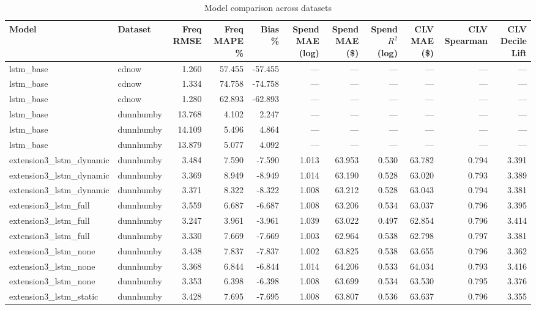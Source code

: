 \begin{table}
\caption{Model comparison across datasets}
\label{tab:model_comparison}
\begin{tabular}{llrrrrrrrrr}
\toprule
Model & Dataset & Freq RMSE & Freq MAPE \% & Bias \% & Spend MAE (log) & Spend MAE (\$) & Spend $R^2$ (log) & CLV MAE (\$) & CLV Spearman & CLV Decile Lift \\
\midrule
lstm_base & cdnow & 1.260 & 57.455 & -57.455 & — & — & — & — & — & — \\
lstm_base & cdnow & 1.334 & 74.758 & -74.758 & — & — & — & — & — & — \\
lstm_base & cdnow & 1.280 & 62.893 & -62.893 & — & — & — & — & — & — \\
lstm_base & dunnhumby & 13.768 & 4.102 & 2.247 & — & — & — & — & — & — \\
lstm_base & dunnhumby & 14.109 & 5.496 & 4.864 & — & — & — & — & — & — \\
lstm_base & dunnhumby & 13.879 & 5.077 & 4.092 & — & — & — & — & — & — \\
extension3_lstm_dynamic & dunnhumby & 3.484 & 7.590 & -7.590 & 1.013 & 63.953 & 0.530 & 63.782 & 0.794 & 3.391 \\
extension3_lstm_dynamic & dunnhumby & 3.369 & 8.949 & -8.949 & 1.014 & 63.190 & 0.528 & 63.020 & 0.793 & 3.389 \\
extension3_lstm_dynamic & dunnhumby & 3.371 & 8.322 & -8.322 & 1.008 & 63.212 & 0.528 & 63.043 & 0.794 & 3.381 \\
extension3_lstm_full & dunnhumby & 3.559 & 6.687 & -6.687 & 1.008 & 63.206 & 0.534 & 63.037 & 0.796 & 3.395 \\
extension3_lstm_full & dunnhumby & 3.247 & 3.961 & -3.961 & 1.039 & 63.022 & 0.497 & 62.854 & 0.796 & 3.414 \\
extension3_lstm_full & dunnhumby & 3.330 & 7.669 & -7.669 & 1.003 & 62.964 & 0.538 & 62.798 & 0.797 & 3.381 \\
extension3_lstm_none & dunnhumby & 3.438 & 7.837 & -7.837 & 1.002 & 63.825 & 0.538 & 63.655 & 0.796 & 3.362 \\
extension3_lstm_none & dunnhumby & 3.368 & 6.844 & -6.844 & 1.014 & 64.206 & 0.533 & 64.034 & 0.793 & 3.416 \\
extension3_lstm_none & dunnhumby & 3.353 & 6.398 & -6.398 & 1.008 & 63.699 & 0.534 & 63.530 & 0.795 & 3.376 \\
extension3_lstm_static & dunnhumby & 3.428 & 7.695 & -7.695 & 1.008 & 63.807 & 0.536 & 63.637 & 0.796 & 3.355 \\

\end{tabular}
\end{table}
